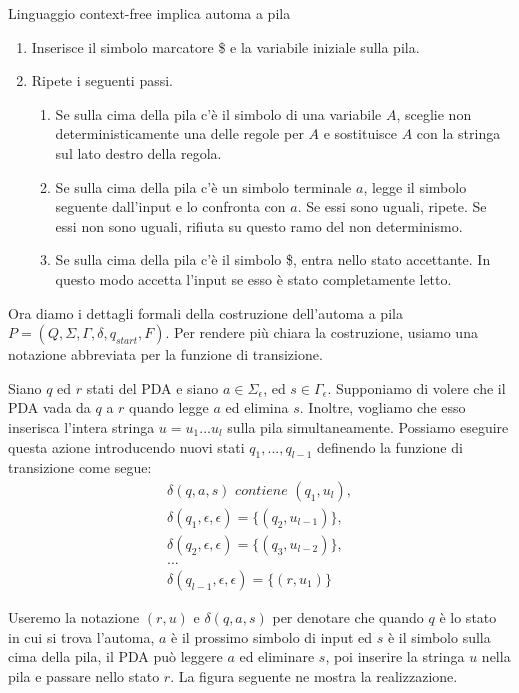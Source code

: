 \begin{Lemma}{Linguaggio context-free implica automa a pila}{}
\begin{osservation}
\begin{enumerate}
    \item Inserisce il simbolo marcatore \$ e la variabile iniziale sulla pila.
    \item Ripete i seguenti passi.
    \begin{enumerate}
        \item Se sulla cima della pila c'è il simbolo di una variabile $A$, sceglie non deterministicamente una delle regole per $A$ e sostituisce $A$ con la stringa sul lato destro della regola.
        \item Se sulla cima della pila c'è un simbolo terminale $a$, legge il simbolo seguente dall'input e lo confronta con $a$. Se essi sono uguali, ripete. Se essi non sono uguali, rifiuta su questo ramo del non determinismo. 
        \item Se sulla cima della pila c'è il simbolo \$, entra nello stato accettante. In questo modo accetta l'input se esso è stato completamente letto.
    \end{enumerate}
\end{enumerate}

\begin{demonstration}
Ora diamo i dettagli formali della costruzione dell'automa a pila $P = (Q,\Sigma, \Gamma, \delta, q_{start}, F)$. Per rendere più chiara la costruzione, usiamo una notazione abbreviata per la funzione di transizione.

Siano $q$ ed $r$ stati del PDA e siano $a \in \Sigma_\epsilon$, ed $s\in\Gamma_\epsilon$. Supponiamo di volere che il PDA vada da $q$ a $r$ quando legge $a$ ed elimina $s$. Inoltre, vogliamo che esso inserisca l'intera stringa $u=u_1...u_l$ sulla pila simultaneamente. Possiamo eseguire questa azione introducendo nuovi stati $q_1, ..., q_{l-1}$ definendo la funzione di transizione come segue:
\begin{gather*}
\delta(q, a, s)\textit{ contiene }(q_1, u_l),\\
\delta(q_1, \epsilon, \epsilon)=\{(q_2, u_{l-1})\},\\
\delta(q_2, \epsilon, \epsilon)=\{(q_3, u_{l-2})\},\\
...\\
\delta(q_{l-1}, \epsilon, \epsilon)=\{(r, u_1)\}
\end{gather*}

Useremo la notazione $(r, u)$ e $\delta(q, a, s)$ per denotare che quando $q$ è lo stato in cui si trova l'automa, $a$ è il prossimo simbolo di input ed $s$ è il simbolo sulla cima della pila, il PDA può leggere $a$ ed eliminare $s$, poi inserire la stringa $u$ nella pila e passare nello stato $r$. La figura seguente ne mostra la realizzazione.


\end{demonstration}
\end{osservation}
\end{Lemma}
